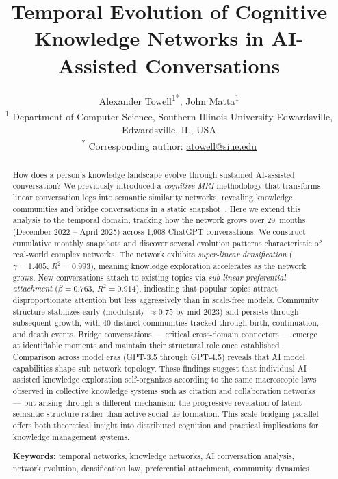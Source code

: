 \documentclass[10pt,letterpaper]{article}
\title{Temporal Evolution of Cognitive Knowledge Networks in AI-Assisted Conversations}
\author{
  Alexander Towell\textsuperscript{1*},
  John Matta\textsuperscript{1} \\[6pt]
  \textsuperscript{1} Department of Computer Science,
  Southern Illinois University Edwardsville, Edwardsville, IL, USA \\[3pt]
  \textsuperscript{*} Corresponding author: \href{mailto:atowell@siue.edu}{atowell@siue.edu}
}
\date{}
\begin{document}
{\sloppy\maketitle}

\begin{abstract}

How does a person's knowledge landscape evolve through sustained AI-assisted conversation? We previously introduced a \emph{cognitive MRI} methodology that transforms linear conversation logs into semantic similarity networks, revealing knowledge communities and bridge conversations in a static snapshot~\citep{towell2025cognitive}. Here we extend this analysis to the temporal domain, tracking how the network grows over 29~months (December 2022 -- April 2025) across 1{,}908 ChatGPT conversations. We construct cumulative monthly snapshots and discover several evolution patterns characteristic of real-world complex networks. The network exhibits \emph{super-linear densification} ($\gamma = 1.405$, $R^2 = 0.993$), meaning knowledge exploration accelerates as the network grows. New conversations attach to existing topics via \emph{sub-linear preferential attachment} ($\beta = 0.763$, $R^2 = 0.914$), indicating that popular topics attract disproportionate attention but less aggressively than in scale-free models. Community structure stabilizes early (modularity $\approx 0.75$ by mid-2023) and persists through subsequent growth, with 40 distinct communities tracked through birth, continuation, and death events. Bridge conversations --- critical cross-domain connectors --- emerge at identifiable moments and maintain their structural role once established. Comparison across model eras (GPT-3.5 through GPT-4.5) reveals that AI model capabilities shape sub-network topology. These findings suggest that individual AI-assisted knowledge exploration self-organizes according to the same macroscopic laws observed in collective knowledge systems such as citation and collaboration networks --- but arising through a different mechanism: the progressive revelation of latent semantic structure rather than active social tie formation. This scale-bridging parallel offers both theoretical insight into distributed cognition and practical implications for knowledge management systems.

\textbf{Keywords:} temporal networks, knowledge networks, AI conversation analysis, network evolution, densification law, preferential attachment, community dynamics
\end{abstract}
\end{document}
